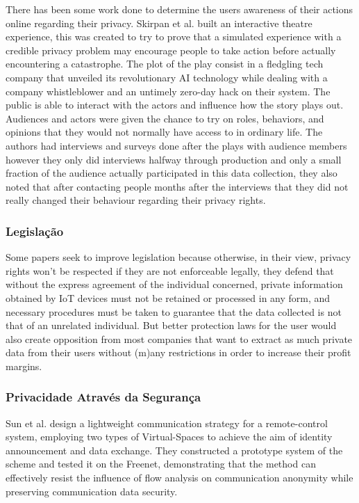 \documentclass[conference]{IEEEtran}
\begin{document}
There has been some work done to determine the users awareness of their
actions online regarding their privacy. Skirpan et al. \cite{SkirpanPrivacy}
built an interactive theatre experience, this was created to try to prove
that a simulated experience with a credible privacy problem may encourage
people to take action before actually encountering a catastrophe. The plot
of the play consist in a fledgling tech company that unveiled its revolutionary
AI technology while dealing with a company whistleblower and an untimely
zero-day hack on their system. The public is able to interact with the actors
and influence how the story plays out. Audiences and actors were given the
chance to try on roles, behaviors, and opinions that they would not normally
have access to in ordinary life. The authors had interviews and surveys
done after the plays with audience members however they only did interviews
halfway through production and only a small fraction of the audience actually
participated in this data collection, they also noted that after contacting
people months after the interviews that they did not really changed their
behaviour regarding their privacy rights.

\subsubsection{Legislação}

Some papers seek to improve legislation \cite{WEBER2015618, FabianoInternet}
because otherwise, in their view, privacy rights won't be respected if they
are not enforceable legally, they defend that without the express agreement
of the individual concerned, private information obtained by IoT devices
must not be retained or processed in any form, and necessary procedures
must be taken to guarantee that the data collected is not that of an unrelated
individual. But better protection laws for the user would also create opposition
from most companies that want to extract as much private data from their
users without (m)any restrictions in order to increase their profit margins.

\subsubsection{Privacidade Através da Segurança}

Sun et al. \cite{SunSecure} design a lightweight communication strategy
for a remote-control system, employing two types of Virtual-Spaces to achieve
the aim of identity announcement and data exchange. They constructed a prototype
system of the scheme and tested it on the Freenet, demonstrating that the
method can effectively resist the influence of flow analysis on communication
anonymity while preserving communication data security.
\end{document}
